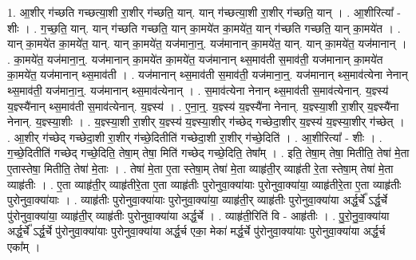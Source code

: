 \documentclass[17pt]{extarticle}
\begin{document}
1. आ॒शीर् ग॑च्छति गच्छत्या॒शी रा॒शीर् ग॑च्छति॒ यान्. यान् ग॑च्छत्या॒शी रा॒शीर् ग॑च्छति॒ यान् । . आ॒शीरित्या᳚ - शीः । . ग॒च्छ॒ति॒ यान्. यान् ग॑च्छति गच्छति॒ यान् का॒मये॑त का॒मये॑त॒ यान् ग॑च्छति गच्छति॒ यान् का॒मये॑त । . यान् का॒मये॑त का॒मये॑त॒ यान्. यान् का॒मये॑त॒ यज॑माना॒न्॒. यज॑मानान् का॒मये॑त॒ यान्. यान् का॒मये॑त॒ यज॑मानान् । . का॒मये॑त॒ यज॑माना॒न्॒. यज॑मानान् का॒मये॑त का॒मये॑त॒ यज॑मानान् थ्स॒माव॑ती स॒माव॑ती॒ यज॑मानान् का॒मये॑त का॒मये॑त॒ यज॑मानान् थ्स॒माव॑ती । . यज॑मानान् थ्स॒माव॑ती स॒माव॑ती॒ यज॑माना॒न्॒. यज॑मानान् थ्स॒माव॑त्येना नेनान् थ्स॒माव॑ती॒ यज॑माना॒न्॒. यज॑मानान् थ्स॒माव॑त्येनान् । . स॒माव॑त्येना नेनान् थ्स॒माव॑ती स॒माव॑त्येनान्. य॒ज्ञ्स्य॑ य॒ज्ञ्स्यै॑नान् थ्स॒माव॑ती स॒माव॑त्येनान्. य॒ज्ञ्स्य॑ । . ए॒ना॒न्॒. य॒ज्ञ्स्य॑ य॒ज्ञ्स्यै॑ना नेनान्. य॒ज्ञ्स्या॒शी रा॒शीर् य॒ज्ञ्स्यै॑ना नेनान्. य॒ज्ञ्स्या॒शीः । . य॒ज्ञ्स्या॒शी रा॒शीर् य॒ज्ञ्स्य॑ य॒ज्ञ्स्या॒शीर् ग॑च्छेद् गच्छेदा॒शीर् य॒ज्ञ्स्य॑ य॒ज्ञ्स्या॒शीर् ग॑च्छेत् । . आ॒शीर् ग॑च्छेद् गच्छेदा॒शी रा॒शीर् ग॑च्छे॒दितीति॑ गच्छेदा॒शी रा॒शीर् ग॑च्छे॒दिति॑ । . आ॒शीरित्या᳚ - शीः । . ग॒च्छे॒दितीति॑ गच्छेद् गच्छे॒दिति॒ तेषा॒म् तेषा॒ मिति॑ गच्छेद् गच्छे॒दिति॒ तेषा᳚म् । . इति॒ तेषा॒म् तेषा॒ मितीति॒ तेषा॑ मे॒ता ए॒तास्तेषा॒ मितीति॒ तेषा॑ मे॒ताः । . तेषा॑ मे॒ता ए॒ता स्तेषा॒म् तेषा॑ मे॒ता व्याहृ॑ती॒र् व्याहृ॑ती रे॒ता स्तेषा॒म् तेषा॑ मे॒ता व्याहृ॑तीः । . ए॒ता व्याहृ॑ती॒र् व्याहृ॑तीरे॒ता ए॒ता व्याहृ॑तीः पुरोनुवा॒क्या॑याः पुरोनुवा॒क्या॑या॒ व्याहृ॑तीरे॒ता ए॒ता व्याहृ॑तीः पुरोनुवा॒क्या॑याः । . व्याहृ॑तीः पुरोनुवा॒क्या॑याः पुरोनुवा॒क्या॑या॒ व्याहृ॑ती॒र् व्याहृ॑तीः पुरोनुवा॒क्या॑या अर्द्ध॒र्चे᳚ ऽर्द्ध॒र्चे पु॑रोनुवा॒क्या॑या॒ व्याहृ॑ती॒र् व्याहृ॑तीः पुरोनुवा॒क्या॑या अर्द्ध॒र्चे । . व्याहृ॑ती॒रिति॑ वि - आहृ॑तीः । . पु॒रो॒नु॒वा॒क्या॑या अर्द्ध॒र्चे᳚ ऽर्द्ध॒र्चे पु॑रोनुवा॒क्या॑याः पुरोनुवा॒क्या॑या अर्द्ध॒र्च एका॒ मेका॑ मर्द्ध॒र्चे पु॑रोनुवा॒क्या॑याः पुरोनुवा॒क्या॑या अर्द्ध॒र्च एका᳚म् । \newline
\end{document}
